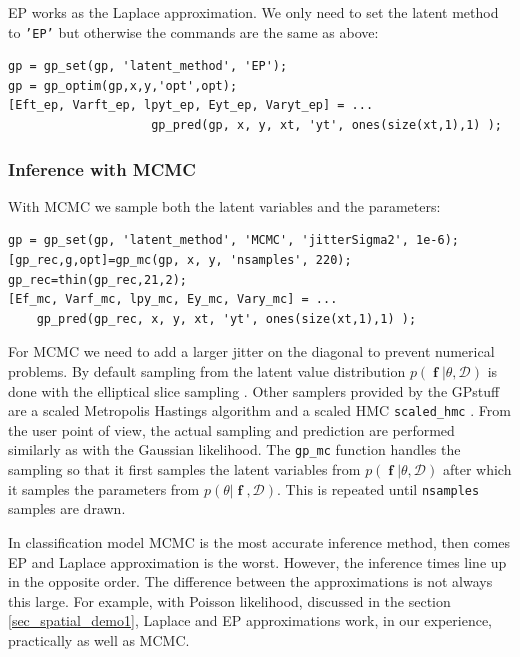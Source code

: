\documentclass[twoside,11pt]{article}
\DeclareMathOperator{\f}{\mathbf{f}}
\newcommand{\pkg}[1]{{\fontseries{b}\selectfont #1}}
\newcommand{\code}[1]{{\normalfont\texttt{#1}}}
\begin{document}
EP works as the Laplace approximation. We only need to set the latent
method to \code{'EP'} but otherwise the commands are the same as above:
%
\begin{verbatim}
gp = gp_set(gp, 'latent_method', 'EP');
gp = gp_optim(gp,x,y,'opt',opt);
[Eft_ep, Varft_ep, lpyt_ep, Eyt_ep, Varyt_ep] = ...
                    gp_pred(gp, x, y, xt, 'yt', ones(size(xt,1),1) );
\end{verbatim}
%

\subsubsection{Inference with MCMC}

With MCMC we sample both the latent variables and the parameters:
\begin{verbatim}
gp = gp_set(gp, 'latent_method', 'MCMC', 'jitterSigma2', 1e-6);
[gp_rec,g,opt]=gp_mc(gp, x, y, 'nsamples', 220);
gp_rec=thin(gp_rec,21,2);
[Ef_mc, Varf_mc, lpy_mc, Ey_mc, Vary_mc] = ...
    gp_pred(gp_rec, x, y, xt, 'yt', ones(size(xt,1),1) );
\end{verbatim}
%
For MCMC we need to add a larger jitter on the diagonal to prevent
numerical problems.
%
By default sampling from the latent value distribution $p(\f|\theta,
\mathcal{D})$ is done with the elliptical slice sampling
\citep{Murray+Adams+MacKay:2010}. Other samplers provided by the
\pkg{GPstuff} are a scaled Metropolis Hastings algorithm
\citep{Neal:1998} and a scaled HMC \code{scaled\_hmc}
\citep{Vanhatalo+Vehtari:2007}. From the user point of view, the
actual sampling and prediction are performed similarly as with the
Gaussian likelihood.  The \code{gp\_mc} function handles the sampling
so that it first samples the latent variables from
$p(\f|\theta,\mathcal{D})$ after which it samples the parameters from
$p(\theta|\f,\mathcal{D})$.  This is repeated until \code{nsamples}
samples are drawn.


In classification model MCMC is the most accurate inference method,
then comes EP and Laplace approximation is the worst.  However, the
inference times line up in the opposite order.  The difference between
the approximations is not always this large.  For example, with
Poisson likelihood, discussed in the section \ref{sec_spatial_demo1},
Laplace and EP approximations work, in our experience, practically as
well as MCMC.
\end{document}
